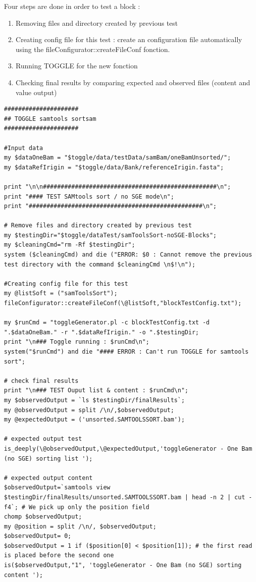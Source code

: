 \documentclass[a4paper,10pt]{report}
\begin{document}

\noindent Four steps are done in order to test a block  :

\begin{enumerate}
\item Removing files and directory created by previous test
\item Creating config file for this test : create an configuration file automatically using the fileConfigurator::createFileConf fonction.
\item Running TOGGLE for the new fonction
\item Checking final results by comparing expected and observed files (content and value output)
\end{enumerate}


\begin{lstlisting}
#####################
## TOGGLE samtools sortsam
#####################

#Input data
my $dataOneBam = "$toggle/data/testData/samBam/oneBamUnsorted/";
my $dataRefIrigin = "$toggle/data/Bank/referenceIrigin.fasta";

print "\n\n#################################################\n";
print "#### TEST SAMtools sort / no SGE mode\n";
print "#################################################\n";

# Remove files and directory created by previous test
my $testingDir="$toggle/dataTest/samToolsSort-noSGE-Blocks";
my $cleaningCmd="rm -Rf $testingDir";
system ($cleaningCmd) and die ("ERROR: $0 : Cannot remove the previous test directory with the command $cleaningCmd \n$!\n");

#Creating config file for this test
my @listSoft = ("samToolsSort");
fileConfigurator::createFileConf(\@listSoft,"blockTestConfig.txt");

my $runCmd = "toggleGenerator.pl -c blockTestConfig.txt -d ".$dataOneBam." -r ".$dataRefIrigin." -o ".$testingDir;
print "\n### Toggle running : $runCmd\n";
system("$runCmd") and die "#### ERROR : Can't run TOGGLE for samtools sort";

# check final results
print "\n### TEST Ouput list & content : $runCmd\n";
my $observedOutput = `ls $testingDir/finalResults`;
my @observedOutput = split /\n/,$observedOutput;
my @expectedOutput = ('unsorted.SAMTOOLSSORT.bam');

# expected output test
is_deeply(\@observedOutput,\@expectedOutput,'toggleGenerator - One Bam (no SGE) sorting list ');

# expected output content
$observedOutput=`samtools view $testingDir/finalResults/unsorted.SAMTOOLSSORT.bam | head -n 2 | cut -f4`; # We pick up only the position field
chomp $observedOutput;
my @position = split /\n/, $observedOutput;
$observedOutput= 0;
$observedOutput = 1 if ($position[0] < $position[1]); # the first read is placed before the second one
is($observedOutput,"1", 'toggleGenerator - One Bam (no SGE) sorting content ');
\end{lstlisting}
\end{document}
